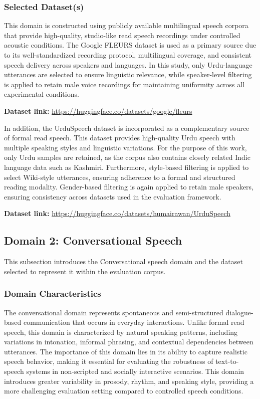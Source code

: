 \documentclass[a4paper,fleqn]{cas-dc}
\begin{document}
    \subsubsection{Selected Dataset(s)}
    \begin{sloppypar}
    \indent This domain is constructed using publicly available multilingual speech corpora that provide high-quality, studio-like read speech recordings under controlled acoustic conditions. The Google FLEURS dataset \citep{conneau2022fleurs} is used as a primary source due to its well-standardized recording protocol, multilingual coverage, and consistent speech delivery across speakers and languages. In this study, only Urdu-language utterances are selected to ensure linguistic relevance, while speaker-level filtering is applied to retain male voice recordings for maintaining uniformity across all experimental conditions.
    
    \noindent \textbf{Dataset link:} \url{https://huggingface.co/datasets/google/fleurs}
    
    \indent In addition, the UrduSpeech dataset is incorporated as a complementary source of formal read speech. This dataset provides high-quality Urdu speech with multiple speaking styles and linguistic variations. For the purpose of this work, only Urdu samples are retained, as the corpus also contains closely related Indic language data such as Kashmiri. Furthermore, style-based filtering is applied to select Wiki-style utterances, ensuring adherence to a formal and structured reading modality. Gender-based filtering is again applied to retain male speakers, ensuring consistency across datasets used in the evaluation framework.
    \end{sloppypar}
    
    \noindent \textbf{Dataset link:} \url{https://huggingface.co/datasets/humairawan/UrduSpeech}
    
    
    \subsection{Domain 2: Conversational Speech}\label{sec:domain-conv}

    This subsection introduces the Conversational speech domain and the dataset selected to represent it within the evaluation corpus.

    \subsubsection{Domain Characteristics}
    \indent The conversational domain represents spontaneous and semi-structured dialogue-based communication that occurs in everyday interactions. Unlike formal read speech, this domain is characterized by natural speaking patterns, including variations in intonation, informal phrasing, and contextual dependencies between utterances. The importance of this domain lies in its ability to capture realistic speech behavior, making it essential for evaluating the robustness of text-to-speech systems in non-scripted and socially interactive scenarios. This domain introduces greater variability in prosody, rhythm, and speaking style, providing a more challenging evaluation setting compared to controlled speech conditions.
    
\end{document}
